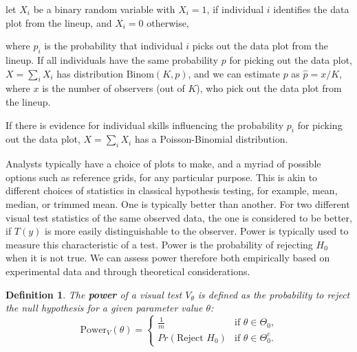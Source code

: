 \documentclass{article}
\newcommand{\red}[1]{{\color{red} #1}} %
\newtheorem{dfn}{Definition}[section]
\begin{document}
let $X_i$ be a binary random variable with $X_i = 1$, if individual $i$ identifies the data plot from the lineup, and $X_i = 0$ otherwise, \red{where $p_i$ is the probability that individual $i$ picks out the data plot from the lineup. 
If all individuals have the same probability $p$ for picking out the data plot, $X = \sum_i X_i$ has distribution $\text{Binom}(K, p)$, and we can estimate $p$ as $\hat{p} = x/K$, where $x$ is the number of observers (out of $K$), who pick out the data plot from the lineup. 

If there is evidence for individual skills influencing the probability $p_i$ for picking out the data plot, 
 $X = \sum_i X_i$ has  a Poisson-Binomial distribution.}




\noindent 
Analysts typically have a choice of plots to make, and a myriad of possible options such as reference grids, for any particular purpose. This is akin to different choices of statistics in classical hypothesis testing, for example, mean, median, or trimmed mean. One is typically better than another. For two different visual test statistics of the same observed data, the one is considered to be better, if $T(y)$ is more easily distinguishable to the observer. Power is typically used to measure this characteristic of a test. Power is the probability of rejecting $H_0$ when it is not true.  We can assess power therefore both empirically based on experimental data and through theoretical considerations. 


\begin{dfn} \label{dfn:power}
The \textbf{power} of a visual test $V_{\theta}$ is defined as the probability to reject the null hypothesis for a given parameter value $\theta$:
    \begin{equation*}
      \text{Power}_V(\theta)= 
        \begin{cases} 
              \frac1m & \text{if $\theta \in \Theta_0$,} \\
              Pr(\text{Reject } H_0) &\text{if $\theta \in \Theta^c_0$.}
        \end{cases}
    \end{equation*}
\end{dfn}
\end{document}
